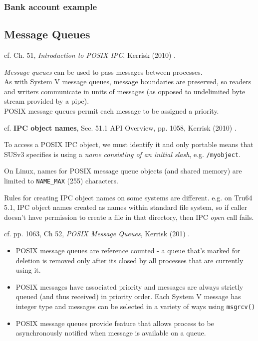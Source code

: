 \documentclass[10pt]{amsart}
\begin{document}
\begin{multicols*}{2}
\subsubsection{Bank account example}



\subsection{Message Queues}

cf. Ch. 51, \emph{Introduction to POSIX IPC}, Kerrisk (2010) \cite{Kerr2010}.

\emph{Message queues} can be used to pass messages between processes. \\
As with System V message queues, message boundaries are preserved, so readers and writers communicate in units of messages (as opposed to undelimited byte stream provided by a pipe). \\
POSIX message queues permit each message to be assigned a priority.

cf. \textbf{IPC object names}, Sec. 51.1 API Overview, pp. 1058, Kerrisk (2010) \cite{Kerr2010}.

To access a POSIX IPC object, we must identify it and only portable means that SUSv3 specifies is using a \emph{name consisting of an initial slash}, e.g. \verb|/myobject|.

On Linux, names for POSIX message queue objects (and shared memory) are limited to \verb|NAME_MAX| (255) characters.

Rules for creating IPC object names on some systems are different. e.g. on Tru64 5.1, IPC object names created as names within standard file system, so if caller doesn't have permission to create a file in that directory, then IPC \emph{open} call fails.

cf. pp. 1063, Ch 52, \emph{POSIX Message Queues}, Kerrisk (201) \cite{Kerr2010}.

\begin{itemize}
	\item POSIX message queues are reference counted - a queue that's marked for deletion is removed only after its closed by all processes that are currently using it.
	\item POSIX messages have associated priority and messages are always strictly queued (and thus received) in priority order. Each System V message has integer type and messages can be selected in a variety of ways using \verb|msgrcv()|
	\item POSIX message queues provide feature that allows process to be asynchronously notified when message is available on a queue.
\end{itemize}




\end{multicols*}
\end{document}
